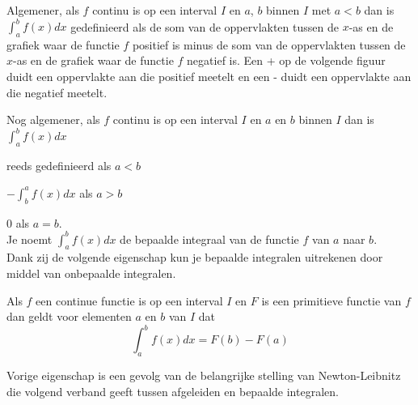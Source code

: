 

Algemener, als $f$ continu is op een interval $I$ en $a$, $b$ binnen $I$ met $a<b$ dan is $\int ^b_a f(x)dx$ gedefinieerd als de som van de oppervlakten tussen de $x$-as en de grafiek waar de functie $f$ positief is minus de som van de oppervlakten tussen de $x$-as en de grafiek waar de functie $f$ negatief is.
Een + op de volgende figuur duidt een oppervlakte aan die positief meetelt en een - duidt een oppervlakte aan die negatief meetelt.\\



Nog algemener, als $f$ continu is op een interval $I$ en $a$ en $b$ binnen $I$ dan is $\int ^b_a f(x)dx$

\hspace{1cm} reeds gedefinieerd als $a<b$

\hspace{1cm} $-\int^a_b f(x)dx$ als $a>b$

\hspace{1cm} 0 als $a=b$.\\

Je noemt $\int^b_a f(x)dx$ de bepaalde integraal van de functie $f$ van $a$ naar $b$.\\

Dank zij de volgende eigenschap kun je bepaalde integralen uitrekenen door middel van onbepaalde integralen.

\begin{eigenschap} Als $f$ een continue functie is op een interval $I$ en $F$ is een primitieve functie van $f$ dan geldt voor elementen $a$ en $b$ van $I$ dat\\
\[\int^b_a f(x)dx = F(b)-F(a)\]
\end{eigenschap}

Vorige eigenschap is een gevolg van de belangrijke stelling van Newton-Leibnitz die volgend verband geeft tussen afgeleiden en bepaalde integralen.

